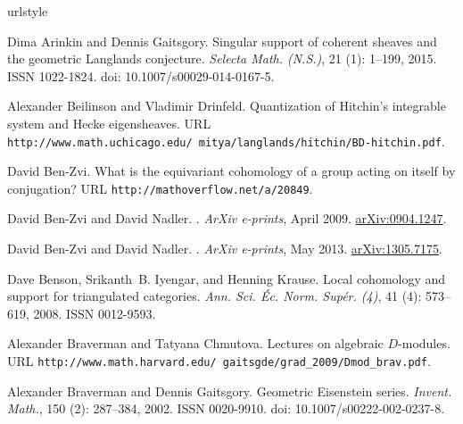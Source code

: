 \documentclass{oupau}
\theoremstyle{remark}
\begin{document}
\begin{thebibliography}{20}
\providecommand{\url}[1]{\texttt{#1}}
\expandafter\ifx\csname urlstyle\endcsname\relax
  \providecommand{\doi}[1]{doi: #1}\else
  \providecommand{\doi}{doi: \begingroup \urlstyle{rm}\Url}\fi

Dima Arinkin and Dennis Gaitsgory.
\newblock Singular support of coherent sheaves and the geometric {L}anglands
  conjecture.
  \newblock \emph{Selecta Math. (N.S.)}, 21 (1):
  1--199, 2015.
\newblock ISSN 1022-1824.
\newblock \doi{10.1007/s00029-014-0167-5}.

Alexander Beilinson and Vladimir Drinfeld.
\newblock Quantization of {H}itchin's integrable system and {H}ecke
  eigensheaves.
\newblock URL
  \url{http://www.math.uchicago.edu/~mitya/langlands/hitchin/BD-hitchin.pdf}.

David Ben-Zvi.
\newblock What is the equivariant cohomology of a group acting on itself by
  conjugation?
\newblock URL \url{http://mathoverflow.net/a/20849}.

David {Ben-Zvi} and David {Nadler}.
.
\newblock \emph{ArXiv e-prints}, April 2009.
\newblock \href{https://www.arxiv.org/abs/0904.1247}{arXiv:0904.1247}.

David {Ben-Zvi} and David {Nadler}.
.
\newblock \emph{ArXiv e-prints}, May 2013.
\newblock \href{https://www.arxiv.org/abs/1305.7175}{arXiv:1305.7175}.

Dave Benson, Srikanth~B. Iyengar, and Henning Krause.
\newblock Local cohomology and support for triangulated categories.
\newblock \emph{Ann. Sci. \'Ec. Norm. Sup\'er. (4)},
  41 (4): 573--619, 2008.
\newblock ISSN 0012-9593.

Alexander Braverman and Tatyana Chmutova.
\newblock Lectures on algebraic $D$-modules.
\newblock URL
  \url{http://www.math.harvard.edu/~gaitsgde/grad_2009/Dmod_brav.pdf}.

Alexander Braverman and Dennis Gaitsgory.
\newblock Geometric {E}isenstein series.
\newblock \emph{Invent. Math.}, 150 (2): 287--384,
  2002.
\newblock ISSN 0020-9910.
\newblock \doi{10.1007/s00222-002-0237-8}.


\end{thebibliography}
\end{document}

